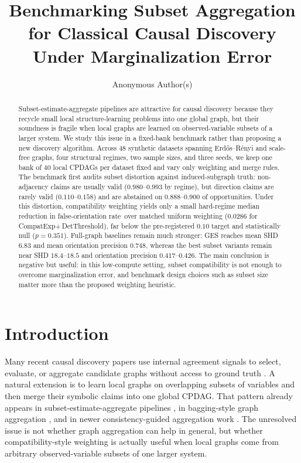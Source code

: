 \documentclass{article}
\title{Benchmarking Subset Aggregation for Classical Causal Discovery Under Marginalization Error}
\author{Anonymous Author(s)}
\newcommand{\method}{CompatExp}
\newcommand{\cpdag}{CPDAG}
\newcommand{\forate}{false-orientation rate}
\begin{document}
\maketitle

\begin{abstract}
Subset-estimate-aggregate pipelines are attractive for causal discovery because they recycle small local structure-learning problems into one global graph, but their soundness is fragile when local graphs are learned on observed-variable subsets of a larger system. We study this issue in a fixed-bank benchmark rather than proposing a new discovery algorithm. Across $48$ synthetic datasets spanning Erd\H{o}s--R\'enyi and scale-free graphs, four structural regimes, two sample sizes, and three seeds, we keep one bank of $40$ local \cpdag s per dataset fixed and vary only weighting and merge rules. The benchmark first audits subset distortion against induced-subgraph truth: non-adjacency claims are usually valid ($0.980$--$0.993$ by regime), but direction claims are rarely valid ($0.110$--$0.158$) and are abstained on $0.888$--$0.900$ of opportunities. Under this distortion, compatibility weighting yields only a small hard-regime median reduction in \forate\ over matched uniform weighting ($0.0286$ for \method+$\,$DetThreshold), far below the pre-registered $0.10$ target and statistically null ($p=0.351$). Full-graph baselines remain much stronger: GES reaches mean SHD $6.83$ and mean orientation precision $0.748$, whereas the best subset variants remain near SHD $18.4$--$18.5$ and orientation precision $0.417$--$0.426$. The main conclusion is negative but useful: in this low-compute setting, subset compatibility is not enough to overcome marginalization error, and benchmark design choices such as subset size matter more than the proposed weighting heuristic.
\end{abstract}

\section{Introduction}

Many recent causal discovery papers use internal agreement signals to select, evaluate, or aggregate candidate graphs without access to ground truth \citep{viinikka2018intersection,faller2024selfcompatibility,schkoda2025lovo}. A natural extension is to learn local graphs on overlapping subsets of variables and then merge their symbolic claims into one global \cpdag. That pattern already appears in subset-estimate-aggregate pipelines \citep{wu2025sample}, in bagging-style graph aggregation \citep{wang2014dagbag,debeire2024bootstrap}, and in newer consistency-guided aggregation work \citep{ninad2025vector}. The unresolved issue is not whether graph aggregation can help in general, but whether compatibility-style weighting is actually useful when local graphs come from arbitrary observed-variable subsets of one larger system.
\end{document}
